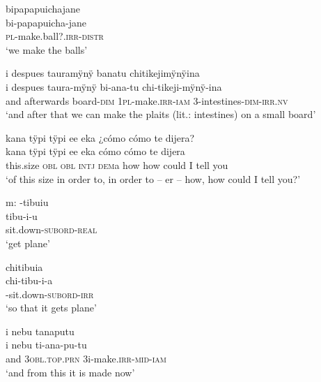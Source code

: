\ea%
\begingl 
\glpreamble bipapapuichajane\\
\gla bi-papapuicha-jane\\ 
\textsc{pl}-make.ball?.\textsc{irr}-\textsc{distr}\\ 
\glft ‘we make the balls’\\ 
\endgl
\xe


\ea%
\begingl 
\glpreamble i despues tauramÿnÿ banatu chitikejimÿnÿina\\
\gla i despues taura-mÿnÿ bi-ana-tu chi-tikeji-mÿnÿ-ina\\ 
\glb and afterwards board-\textsc{dim} 1\textsc{pl}-make.\textsc{irr}-\textsc{iam} 3-intestines-\textsc{dim}-\textsc{irr.nv}\\ 
\glft ‘and after that we can make the plaits (lit.: intestines) on a small board’\\ 
\endgl
\xe


\ea%
\begingl 
\glpreamble kana tÿpi tÿpi ee eka ¿cómo cómo te dijera?\\
\gla kana tÿpi tÿpi ee eka {cómo cómo te dijera}\\ 
\glb this.size \textsc{obl} \textsc{obl} \textsc{intj} \textsc{dem}a {how how could I tell you}\\ 
\glft ‘of this size in order to, in order to – er – how, how could I tell you?’\\ 
\endgl
\xe


\ea%
\begingl 
\glpreamble \textup{m:} -tibuiu\\
\gla tibu-i-u\\ 
\glb sit.down-\textsc{subord}-\textsc{real}\\ 
\glft ‘get plane’\\ 
\endgl
\xe

\ea%
\begingl 
\glpreamble chitibuia\\
\gla chi-tibu-i-a\\ 
-sit.down-\textsc{subord}-\textsc{irr}\\ 
\glft ‘so that it gets plane’\\ 
\endgl
\xe

\ea%
\begingl 
\glpreamble i nebu tanaputu\\
\gla i nebu ti-ana-pu-tu\\ 
\glb and 3\textsc{obl.top.prn} 3i-make.\textsc{irr}-\textsc{mid}-\textsc{iam}\\ 
\glft ‘and from this it is made now’\\ 
\endgl
\xe

